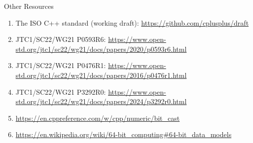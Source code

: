 
\begin{frame}{Other Resources}
  \begin{enumerate}
  \item The ISO C++ standard (working draft): \url{https://github.com/cplusplus/draft}

  \item JTC1/SC22/WG21 P0593R6: \url{https://www.open-std.org/jtc1/sc22/wg21/docs/papers/2020/p0593r6.html}
  \item JTC1/SC22/WG21 P0476R1: \url{https://www.open-std.org/jtc1/sc22/wg21/docs/papers/2016/p0476r1.html}
  \item JTC1/SC22/WG21 P3292R0: \url{https://www.open-std.org/jtc1/sc22/wg21/docs/papers/2024/p3292r0.html}

  \item \url{https://en.cppreference.com/w/cpp/numeric/bit_cast}

  \item \url{https://en.wikipedia.org/wiki/64-bit_computing\#64-bit_data_models}

  \end{enumerate}
\end{frame}
